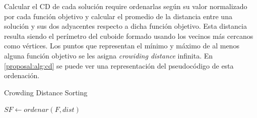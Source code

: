 
Calcular el CD de cada soluci\'on require ordenarlas seg\'un su valor normalizado por cada funci\'on objetivo y calcular el promedio de la distancia entre una soluci\'on y sus dos adyacentes respecto a dicha funci\'on objetivo. Esta distancia resulta siendo el per\'imetro del cuboide formado usando los vecinos m\'as cercanos como v\'ertices. Los puntos que representan el m\'inimo y m\'aximo de al menos alguna funci\'on objetivo se les asigna \textit{crowiding distance} infinita. En \ref{proposal:alg:cd} se puede ver una representaci\'on del pseudoc\'odigo de esta ordenaci\'on.

\begin{algorithm*}[ht]
    \caption{Crowding Distance Sorting}
    \label{proposal:alg:cd}


    $SF \gets ordenar(F, dist)$ 
\end{algorithm*}





